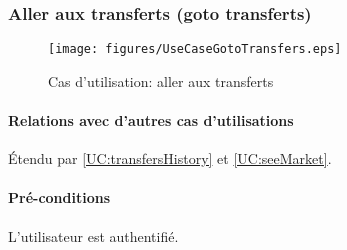 

\subsubsection{Aller aux transferts (goto transferts)} 
\begin{figure}[h]
  \centering
  \texttt{[image: figures/UseCaseGotoTransfers.eps]}
   \caption{\label{fig:UC:gotoTransfers} Cas d'utilisation: aller aux transferts}
\end{figure}

\label{UC:gotoTransfers}
\paragraph{Relations avec d'autres cas d'utilisations}
Étendu par \ref{UC:transfersHistory} et \ref{UC:seeMarket}.
\paragraph{Pré-conditions}
\begin{list}{}{\leftmargin=1.5em}
\item{L'utilisateur est authentifié.}
\end{list}
